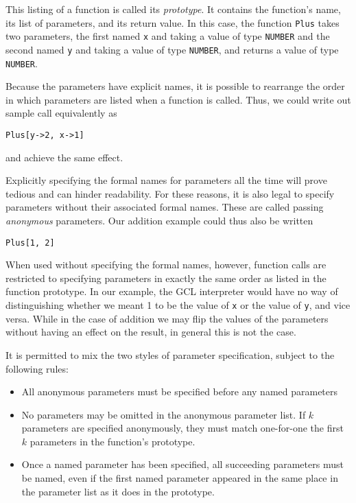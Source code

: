 \noindent This listing of a function is called its {\it prototype}.  
It contains the function's name, its list of parameters, and its return
value.  In this case, the function {\tt Plus} takes two parameters, the
first named \verb+x+ and taking a value of type {\tt NUMBER} and the
second named \verb+y+ and taking a value of type {\tt NUMBER}, and
returns a value of type {\tt NUMBER}.

Because the parameters have explicit names, it is possible to rearrange
the order in which parameters are listed when a function is called.
Thus, we could write out sample call equivalently as

\begin{verbatim}
Plus[y->2, x->1]
\end{verbatim}

\noindent and achieve the same effect.

Explicitly specifying the formal names for parameters all the time
will prove tedious and can hinder readability.  For these reasons, it is
also legal to specify parameters without their associated formal names.
These are called passing {\it anonymous} parameters.  Our addition
example could thus also be written

\begin{verbatim}
Plus[1, 2]
\end{verbatim}

When used without specifying the formal names, however, function
calls are restricted to specifying parameters in exactly the same
order as listed in the function prototype.  In our example, the GCL
interpreter would have no way of distinguishing whether we meant 1 to
be the value of \verb+x+ or the value of \verb+y+, and vice versa.
While in the case of addition we may flip the values of the parameters
without having an effect on the result, in general this is not the
case.

It is permitted to mix the two styles of parameter specification,
subject to the following rules:

\begin{itemize}
\item All anonymous parameters must be specified before any named
parameters
\item No parameters may be omitted in the anonymous parameter list.
If $k$ parameters are specified anonymously, they must match
one-for-one the first $k$ parameters in the function's prototype.
\item Once a named parameter has been specified, all succeeding
parameters must be named, even if the first named parameter appeared
in the same place in the parameter list as it does in the prototype.
\end{itemize}

